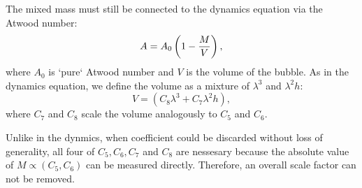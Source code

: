 The mixed mass must still be connected to the dynamics equation via the Atwood number:
\begin{equation} \elabel{effective-atwood}
A = A_0 \left( 1 - \frac{M}{V}\right),
\end{equation}
where $A_0$ is `pure` Atwood number and
$V$ is the volume of the bubble.
As in the dynamics equation, we define the volume as a mixture of $\lambda^3$ and $\lambda^2 h$:
\begin{equation}
V = \left(C_8 \lambda^3 + C_7 \lambda^2 h\right),
\end{equation}
where $C_7$ and $C_8$ scale the volume analogously to $C_5$ and $C_6$.

Unlike in the dynmics, when coefficient could be discarded without loss of generality, all four of $C_5, C_6, C_7$ and $C_8$ are nessesary because the absolute value of $M \propto (C_5, C_6)$ can be measured directly.
Therefore, an overall scale factor can not be removed.

\begin{comment}
The quantitiy of mixed fluid $M$ is modeledy by simple diffusion:
\begin{equation}
\dot{M} = \frac{D S}{2 \sqrt{\pi} \delta}
\end{equation}
where D is the diffusivity,
$S$ is the surface area, and 
$\delta$ is the interface width.
We approximate the scala profile as an error function, yielding an expression for the thickness
\begin{equation}
\delta = \frac{M \sqrt{\pi}}{S}
\end{equation}
In the spirit of the inertial term, \eref{inertia}, we write the surface area as a mix of a terms including and excluding the stream-wise length scale $h$:
\begin{equation}
S = C_5 \lambda h + C_6 \lambda^2
\end{equation}
Togther, this yields:
\begin{equation}
\dot{M} = \frac{1}{2 \pi} D (C_5 \lambda h + C_6 \lambda^2)^2 \frac{1}{M}.
\end{equation}
Finally, we couple to the dynamic equation by relating the mixed fluid to the dynamic Atwood number:
\begin{equation} \elabel{effective-atwood}
A = A_0 \left(1 - \frac{M}{C_3 \lambda^2 h  + C_4 \lambda^3} \right)
\end{equation}
We can non-dimensionalize by defining
\begin{equation}
m = \frac{M}{\lambda^3},
\end{equation}
which simplifes:
\begin{equation}
\dot{m} = \frac{1}{\text{Sc} \sqrt{\pi \text{Gr}}} \left(C_5 z + C_6\right)^2 \frac{1}{m},
\end{equation}
where $\text{Sc} = \nu / D$ is the Schmidt number.

\end{comment}

